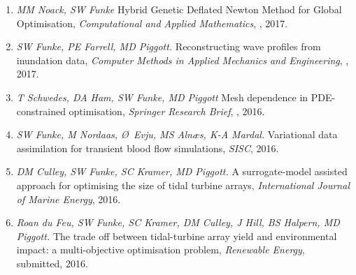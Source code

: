 \documentclass[11pt]{article}
\begin{document}
\begin{enumerate}
    \item \textit{MM Noack, SW Funke} Hybrid Genetic Deflated Newton Method for Global Optimisation, \textit{Computational and Applied Mathematics}, \href{}{}, 2017.
    \item \textit{SW Funke, PE Farrell, MD Piggott.} Reconstructing wave profiles from inundation data, \textit{Computer Methods in Applied Mechanics and Engineering}, \href{}{}, 2017.
    \item \textit{T Schwedes, DA Ham, SW Funke,  MD Piggott} Mesh dependence in PDE-constrained optimisation, \textit{Springer Research Brief}, \href{}{}, 2016.
    \item \textit{SW Funke, M Nordaas, \O~Evju, MS Aln{\ae}s, K-A Mardal.} Variational data assimilation for transient blood flow simulations, \textit{SISC}, 2016.
    \item \textit{DM Culley, SW Funke, SC Kramer, MD Piggott.} A surrogate-model assisted approach for optimising the size of tidal turbine arrays, \textit{International Journal of Marine Energy}, 2016.
\item \textit{Roan du Feu, SW Funke, SC Kramer, DM Culley, J Hill, BS Halpern, MD Piggott.} The trade off between tidal-turbine array yield and environmental impact: a multi-objective optimisation problem, \textit{Renewable Energy}, submitted, 2016.
\end{enumerate}

\end{document}
